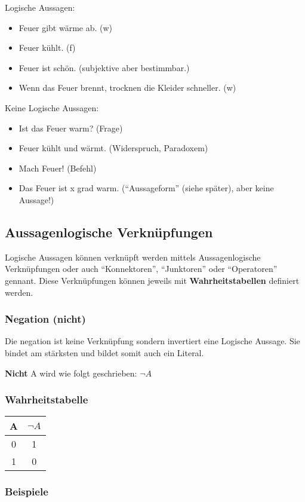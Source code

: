 \documentclass[a4paper,12pt]{article}
\begin{document}
Logische Aussagen:
\begin{itemize}
  \item Feuer gibt wärme ab. (w)
  \item Feuer kühlt. (f)
  \item Feuer ist schön. (subjektive aber bestimmbar.)
  \item Wenn das Feuer brennt, trocknen die Kleider schneller. (w)
\end{itemize}

Keine Logische Aussagen:
\begin{itemize}
  \item Ist das Feuer warm? (Frage)
  \item Feuer kühlt und wärmt. (Widerspruch, Paradoxem)
  \item Mach Feuer! (Befehl)
  \item Das Feuer ist x grad warm. (“Aussageform” (siehe später), aber keine Aussage!)
\end{itemize}
\newpage
\subsection{Aussagenlogische Verknüpfungen}
Logische Aussagen können verknüpft werden mittels Aussagenlogische Verknüpfungen oder auch “Konnektoren”, “Junktoren” oder “Operatoren” gennant. Diese Verknüpfungen können jeweils mit \textbf{Wahrheitstabellen} definiert werden.

\subsubsection{Negation (nicht)}
Die negation ist keine Verknüpfung sondern invertiert eine Logische Aussage. Sie bindet am stärksten und bildet somit auch ein Literal. 

\textbf{Nicht} A wird wie folgt geschrieben: \( \neg A \)

\subsubsection*{Wahrheitstabelle}
\begin{tabular}{c || c}
  A & \( \neg A \) \\
  \hline
  0  & 1 \\
  1  & 0\\
\end{tabular}\break

\subsubsection*{Beispiele}
\end{document}
